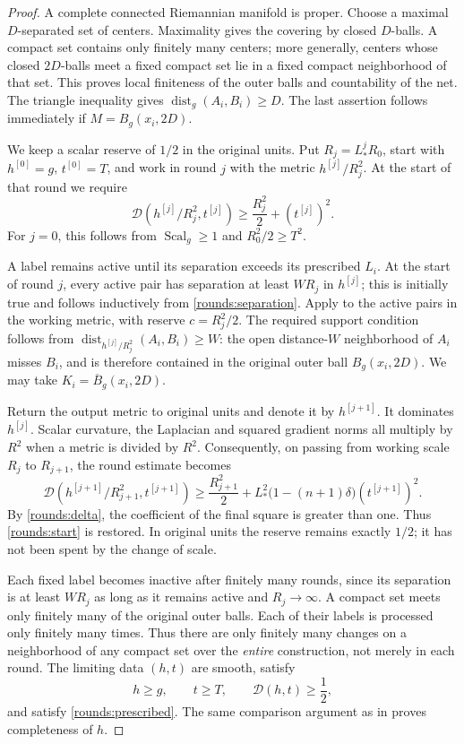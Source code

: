 \documentclass[11pt]{article}
\numberwithin{equation}{section}
\theoremstyle{definition}
\theoremstyle{remark}
\begin{document}
\begin{proof}
A complete connected Riemannian manifold is proper. Choose a maximal
\(D\)-separated set of centers. Maximality gives the covering by closed
\(D\)-balls. A compact set contains only finitely many centers; more
generally, centers whose closed \(2D\)-balls meet a fixed compact set
lie in a fixed compact neighborhood of that set. This proves local
finiteness of the outer balls and countability of the net. The triangle
inequality gives \(\operatorname{dist}_g(A_i,B_i)\ge D\). The last assertion follows
immediately if \(M=B_g(x_i,2D)\).

We keep a scalar reserve of \(1/2\) in the original units. Put
\(R_j=L_*^jR_0\), start with \(h^{[0]}=g\), \(t^{[0]}=T\), and work in
round \(j\) with the metric \(h^{[j]}/R_j^2\). At the start of that
round we require
\begin{equation}\label{rounds:start}
 \mathcal D(h^{[j]}/R_j^2,t^{[j]})
 \ge \frac{R_j^2}{2}+(t^{[j]})^2.
\end{equation}
For \(j=0\), this follows from \(\operatorname{Scal}_g\ge1\) and
\(R_0^2/2\ge T^2\).

A label remains active until its separation exceeds its prescribed
\(L_i\). At the start of round \(j\), every active pair has separation
at least \(WR_j\) in \(h^{[j]}\); this is initially true and follows
inductively from \eqref{rounds:separation}. Apply  to
the active pairs in the working metric, with reserve \(c=R_j^2/2\).
The required support condition follows from
\(\operatorname{dist}_{h^{[j]}/R_j^2}(A_i,B_i)\ge W\): the open distance-\(W\)
neighborhood of \(A_i\) misses \(B_i\), and is therefore contained in
the original outer ball \(B_g(x_i,2D)\). We may take
\(K_i=\overline B_g(x_i,2D)\).

Return the output metric to original units and denote it by
\(h^{[j+1]}\). It dominates \(h^{[j]}\). Scalar curvature, the
Laplacian and squared gradient norms all multiply by \(R^2\) when a
metric is divided by \(R^2\). Consequently, on passing from working
scale \(R_j\) to \(R_{j+1}\), the round estimate becomes
\[
 \mathcal D(h^{[j+1]}/R_{j+1}^2,t^{[j+1]})
 \ge \frac{R_{j+1}^2}{2}
 +L_*^2\bigl(1-(n+1)\delta\bigr)(t^{[j+1]})^2.
\]
By \eqref{rounds:delta}, the coefficient of the final square is greater
than one. Thus \eqref{rounds:start} is restored. In original units the
reserve remains exactly \(1/2\); it has not been spent by the change
of scale.

Each fixed label becomes inactive after finitely many rounds, since
its separation is at least \(WR_j\) as long as it remains active and
\(R_j\to\infty\). A compact set meets only finitely many of the
original outer balls. Each of their labels is processed only finitely
many times. Thus there are only finitely many changes on a neighborhood
of any compact set over the \emph{entire} construction, not merely in
each round. The limiting data \((h,t)\) are smooth, satisfy
\[
 h\ge g,\qquad t\ge T,\qquad \mathcal D(h,t)\ge\frac12,
\]
and satisfy \eqref{rounds:prescribed}. The same comparison argument as
in  proves completeness of \(h\).


\end{proof}
\end{document}

